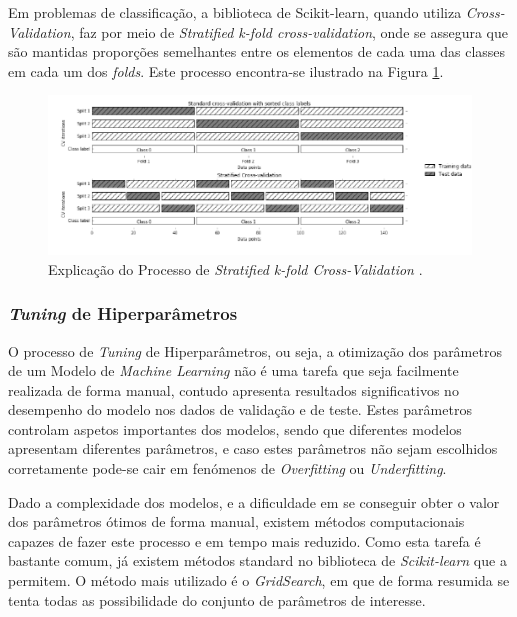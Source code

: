 \documentclass[12pt,a4paper,twoside]{report}
\begin{document}
{Em problemas de classificação, a biblioteca de Scikit-learn, quando utiliza \textit{Cross-Validation}, faz por meio de \textit{Stratified k-fold cross-validation}, onde se assegura que são mantidas proporções semelhantes entre os elementos de cada uma das classes em cada um dos \textit{folds}. Este processo encontra-se ilustrado na Figura \ref{fig:stratifiedcross}.

\begin{figure}[H]
    \centering
    \includegraphics[width=1\textwidth]{imagens/stratifiedcrossvalidation.png}
    \caption{Explicação do Processo de \textit{Stratified k-fold Cross-Validation} \cite{müller2016introduction}.}
    \label{fig:stratifiedcross}
\end{figure}


\subsubsection{\textit{Tuning} de Hiperparâmetros}

O processo de \textit{Tuning} de Hiperparâmetros, ou seja, a otimização dos parâmetros de um Modelo de \textit{Machine Learning} não é uma tarefa que seja facilmente realizada de forma manual, contudo apresenta resultados significativos no desempenho do modelo nos dados de validação e de teste. Estes parâmetros controlam aspetos importantes dos modelos, sendo que diferentes modelos apresentam diferentes parâmetros, e caso estes parâmetros não sejam escolhidos corretamente pode-se cair em fenómenos de \textit{Overfitting} ou \textit{Underfitting}.

Dado a complexidade dos modelos, e a dificuldade em se conseguir obter o valor dos parâmetros ótimos de forma manual, existem métodos computacionais capazes de fazer este processo e em tempo mais reduzido. Como esta tarefa é bastante comum, já existem métodos standard no biblioteca de \textit{Scikit-learn} que a permitem. O método mais utilizado é o \textit{GridSearch}, em que de forma resumida se tenta todas as possibilidade do conjunto de parâmetros de interesse.

}
\end{document}
